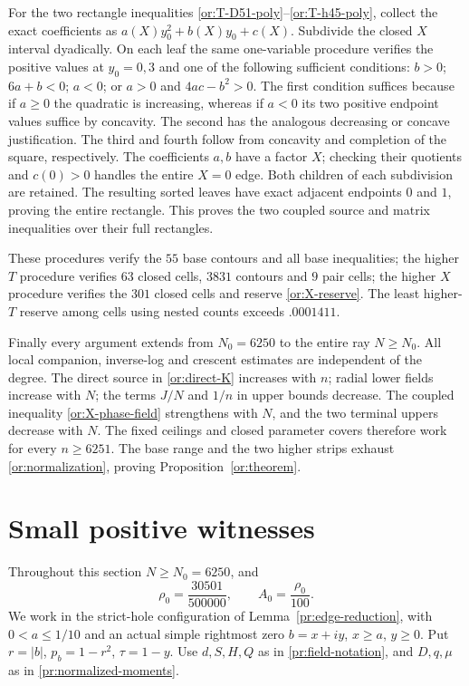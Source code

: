 \documentclass[11pt,reqno]{amsart}
\numberwithin{equation}{section}
\theoremstyle{definition}
\theoremstyle{remark}
\begin{document}
For the two rectangle inequalities
\eqref{or:T-D51-poly}--\eqref{or:T-h45-poly}, collect the exact
coefficients as $a(X)y_0^2+b(X)y_0+c(X)$.  Subdivide the closed
$X$ interval dyadically.  On each leaf the same one-variable procedure
verifies the positive values at $y_0=0,3$ and one of the following
sufficient conditions: $b>0$; $6a+b<0$; $a<0$; or $a>0$ and
$4ac-b^2>0$.  The first condition suffices because if $a\ge0$ the
quadratic is increasing, whereas if $a<0$ its two positive endpoint
values suffice by concavity.  The second has the analogous decreasing
or concave justification.  The third and fourth follow from concavity
and completion of the square, respectively.
The coefficients $a,b$ have a factor $X$; checking their quotients
and $c(0)>0$ handles the entire $X=0$ edge.  Both children of each
subdivision are retained.  The resulting sorted leaves have exact
adjacent endpoints $0$ and $1$, proving the entire rectangle.
This proves the two coupled source and matrix inequalities over their
full rectangles.

These procedures verify the $55$ base contours and all base
inequalities; the higher $T$ procedure verifies $63$ closed cells,
$3831$ contours and $9$ pair cells; the higher $X$ procedure verifies
the $301$ closed cells and reserve \eqref{or:X-reserve}.
The least higher-$T$ reserve among cells using nested counts exceeds
$.0001411$.

Finally every argument extends from $N_0=6250$ to the entire ray
$N\ge N_0$.  All local companion, inverse-log and crescent estimates
are independent of the degree.  The direct source in
\eqref{or:direct-K} increases with $n$; radial lower fields increase
with $N$; the terms $J/N$ and $1/n$ in upper bounds decrease.
The coupled inequality \eqref{or:X-phase-field} strengthens with
$N$, and the two terminal uppers decrease with $N$.
The fixed ceilings and closed parameter covers therefore
work for every $n\ge6251$.  The base range and the two higher strips
exhaust \eqref{or:normalization}, proving
Proposition~\ref{or:theorem}.

\section{Small positive witnesses}\label{sec:small}

Throughout this section $N\ge N_0=6250$, and
\[
 \rho_0=\frac{30501}{500000},\qquad A_0=\frac{\rho_0}{100}.
\]
We work in the strict-hole configuration of
Lemma~\ref{pr:edge-reduction}, with $0<a\le1/10$ and an actual
simple rightmost zero $b=x+iy$, $x\ge a$, $y\ge0$.
Put $r=|b|$, $p_b=1-r^2$, $\tau=1-y$.
Use $d,S,H,Q$ as in \eqref{pr:field-notation}, and
$D,q,\mu$ as in \eqref{pr:normalized-moments}.
\end{document}
